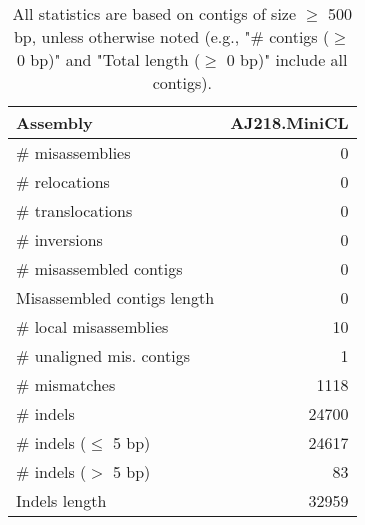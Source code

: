 \documentclass[12pt,a4paper]{article}
\begin{document}
\begin{table}[ht]
\begin{center}
\caption{All statistics are based on contigs of size $\geq$ 500 bp, unless otherwise noted (e.g., "\# contigs ($\geq$ 0 bp)" and "Total length ($\geq$ 0 bp)" include all contigs).}
\begin{tabular}{|l*{1}{|r}|}
\hline
Assembly & AJ218.MiniCL \\ \hline
\# misassemblies & 0 \\ \hline
\hspace{5mm}\# relocations & 0 \\ \hline
\hspace{5mm}\# translocations & 0 \\ \hline
\hspace{5mm}\# inversions & 0 \\ \hline
\# misassembled contigs & 0 \\ \hline
Misassembled contigs length & 0 \\ \hline
\# local misassemblies & 10 \\ \hline
\# unaligned mis. contigs & 1 \\ \hline
\# mismatches & 1118 \\ \hline
\# indels & 24700 \\ \hline
\hspace{5mm}\# indels ($\leq$ 5 bp) & 24617 \\ \hline
\hspace{5mm}\# indels ($>$ 5 bp) & 83 \\ \hline
Indels length & 32959 \\ \hline
\end{tabular}
\end{center}
\end{table}
\end{document}
